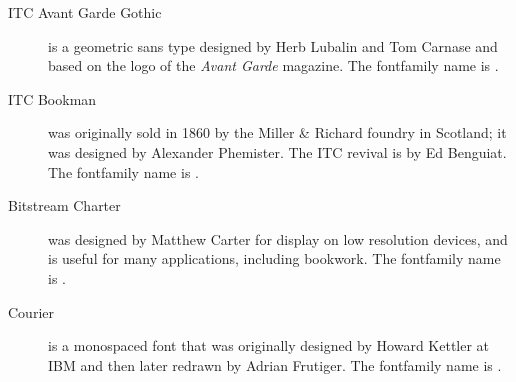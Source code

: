 \begin{description}
\item[ITC Avant Garde Gothic] { 
  is a geometric sans type designed 
  by Herb Lubalin and Tom Carnase and 
  based on the logo of the \textit{Avant Garde} magazine. 
The fontfamily name is .

\vspace{0.5\onelineskip}
\fox\par\Kafka\par\namesAZ
\vspace{0.5\onelineskip}
}

\item[ITC Bookman] { was originally 
sold in 1860 by the Miller \&  Richard foundry 
in Scotland; it was designed by 
Alexander Phemister. The ITC revival is by
Ed Benguiat. 
The fontfamily name is .


\vspace{0.5\onelineskip}
\fox\par\Kafka\par\namesAZ
\vspace{0.5\onelineskip}
}

\item[Bitstream Charter] { was designed
by Matthew Carter for display on low resolution
devices, and is useful for many applications, including bookwork.
The fontfamily name is .

\vspace{0.5\onelineskip}
\fox\par\Kafka\par\namesAZ
\vspace{0.5\onelineskip}
}

\item[Courier] { is a monospaced font
that was originally
designed by Howard Kettler at IBM and then later
redrawn by Adrian Frutiger.
The fontfamily name is .

\vspace{0.5\onelineskip}
\fox\par\Kafka\par\namesAZ
\vspace{0.5\onelineskip}
}


\end{description}
